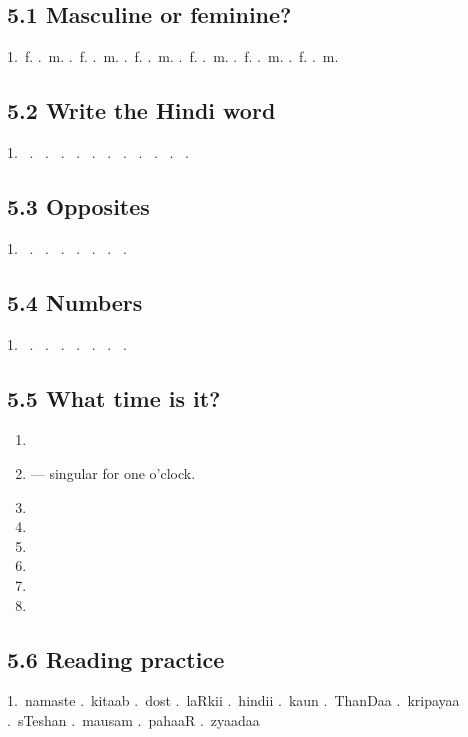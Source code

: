 \subsection{5.1 Masculine or feminine?}
1.\ f. .\ m. .\ f. .\ m. .\ f. .\ m. .\ f. .\ m. .\ f. .\ m. .\ f. .\ m.

\subsection{5.2 Write the Hindi word}
1.\  .\  .\  .\  .\  .\  .\  .\  .\  .\  .\  .\ 

\subsection{5.3 Opposites}
1.\  .\  .\  .\  .\  .\  .\  .\ 

\subsection{5.4 Numbers}
1.\  .\  .\  .\  .\  .\  .\  .\ 

\subsection{5.5 What time is it?}
\begin{enumerate}
  \item {}
  \item {} — singular for one o'clock.
  \item {}
  \item {}
  \item {}
  \item {}
  \item {}
  \item {}
\end{enumerate}

\subsection{5.6 Reading practice}
1.\ namaste .\ kitaab .\ dost .\ laRkii .\ hindii .\ kaun .\ ThanDaa .\ kripayaa .\ sTeshan .\ mausam .\ pahaaR .\ zyaadaa

